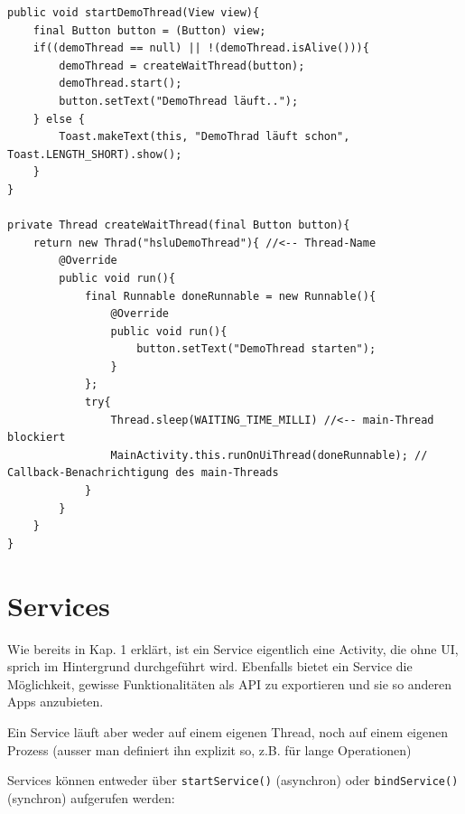 \documentclass[a4paper, 11pt]{article}
\newcommand{\code}[1]{\texttt{#1}}
\begin{document}
\begin{lstlisting}[caption={}]
public void startDemoThread(View view){
	final Button button = (Button) view;
	if((demoThread == null) || !(demoThread.isAlive())){
		demoThread = createWaitThread(button);
		demoThread.start();
		button.setText("DemoThread läuft..");
	} else {
		Toast.makeText(this, "DemoThrad läuft schon", Toast.LENGTH_SHORT).show();
	}
}

private Thread createWaitThread(final Button button){
	return new Thrad("hsluDemoThread"){ //<-- Thread-Name
		@Override
		public void run(){
			final Runnable doneRunnable = new Runnable(){
				@Override
				public void run(){
					button.setText("DemoThread starten");
				}
			};
			try{
				Thread.sleep(WAITING_TIME_MILLI) //<-- main-Thread blockiert
				MainActivity.this.runOnUiThread(doneRunnable); // Callback-Benachrichtigung des main-Threads
			}
		}	
	}
}
\end{lstlisting}

\section{Services}
Wie bereits in Kap. 1 erklärt, ist ein Service eigentlich eine Activity, die ohne UI, sprich im Hintergrund durchgeführt wird. Ebenfalls bietet ein Service die Möglichkeit, gewisse Funktionalitäten als API zu exportieren und sie so anderen Apps anzubieten.

Ein Service läuft aber weder auf einem eigenen Thread, noch auf einem eigenen Prozess (ausser man definiert ihn explizit so, z.B. für lange Operationen)
\vspace{10px}

\noindent Services können entweder über \code{startService()} (asynchron) oder \code{bindService()} (synchron) aufgerufen werden:
\end{document}
